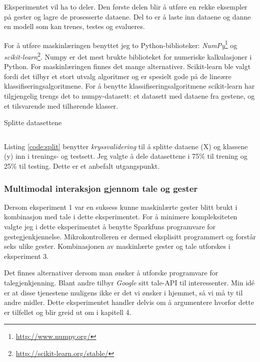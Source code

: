 Eksperimentet vil ha to deler. Den første delen blir å utføre en rekke eksempler på gester og lagre de prosesserte dataene. Del to er å laste inn dataene og danne en modell som kan trenes, testes og evalueres.  

For å utføre maskinlæringen benyttet jeg to Python-biblioteker: \emph{NumPy}\footnote{\url{http://www.numpy.org/}} og \emph{scikit-learn}\footnote{\url{http://scikit-learn.org/stable/}}. Numpy er det mest brukte biblioteket for numeriske kalkulasjoner i Python. For maskinlæringen finnes det mange alternativer. Scikit-learn ble valgt fordi det tilbyr et stort utvalg algoritmer og er spesielt gode på de lineære klassifiseringsalgoritmene. For å benytte klassifiseringsalgoritmene scikit-learn har tilgjengelig trengs det to numpy-datasett: et datasett med dataene fra gestene, og et tilsvarende med tilhørende klasser.
\begin{listing}[ht]
\caption{Splitte datasettene}
\inputminted[fontsize=\footnotesize]{python}{kodesnutter/split_data.py}
\label{code:split}
\end{listing}
Listing \ref{code:split} benytter \emph{kryssvalidering} til å splitte dataene (X) og klassene (y) inn i trenings- og testsett. Jeg valgte å dele datasettene i 75\% til trening og 25\% til testing. Dette er et anbefalt utgangspunkt.

\subsubsection{Multimodal interaksjon gjennom tale og gester}
\label{ch:multimodalimpl}
Dersom eksperiment 1 var en suksess kunne maskinlærte gester blitt brukt i kombinasjon med tale i dette eksperimentet. For å minimere kompleksiteten valgte jeg i dette eksperimentet å benytte Sparkfuns programvare for gestegjenkjennelse. Mikrokontrolleren er dermed eksplisitt programmert og forstår seks ulike gester. Kombinasjonen av maskinlærte gester og tale utforskes i eksperiment 3.

Det finnes alternativer dersom man ønsker å utforske programvare for talegjenkjenning. Blant andre tilbyr \emph{Google} sitt tale-API til interessenter. Min idé er at disse tjenestene muligens ikke er det vi ønsker i hjemmet, så vi må ty til andre midler. Dette eksperimentet handler delvis om å argumentere hvorfor dette er tilfellet og blir greid ut om i kapitell 4. 

